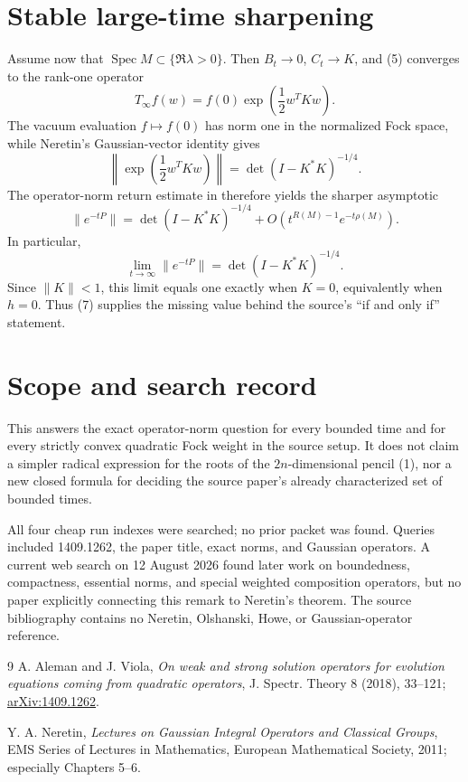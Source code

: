 \documentclass[11pt]{article}
\newcommand{\Spec}{\operatorname{Spec}}
\begin{document}
\section*{Stable large-time sharpening}

Assume now that \(\Spec M\subset\{\Re\lambda>0\}\).  Then \(B_t\to0\),
\(C_t\to K\), and (5) converges to the rank-one operator
\[
 T_\infty f(w)=f(0)\exp\!\left(\frac12w^TKw\right).
\]
The vacuum evaluation \(f\mapsto f(0)\) has norm one in the normalized Fock
space, while Neretin's Gaussian-vector identity gives
\[
 \left\|\exp\!\left(\frac12w^TKw\right)\right\|
 =\det(I-K^*K)^{-1/4}.
\]
The operator-norm return estimate in \cite[Proposition 4.4 and Remark 4.6]{AV}
therefore yields the sharper asymptotic
\[
 \boxed{
 \|e^{-tP}\|=\det(I-K^*K)^{-1/4}
 +O\!\left(t^{R(M)-1}e^{-t\rho(M)}\right).}             \tag{7}
\]
In particular,
\[
 \lim_{t\to\infty}\|e^{-tP}\|=\det(I-K^*K)^{-1/4}.
\]
Since \(\|K\|<1\), this limit equals one exactly when \(K=0\), equivalently
when \(h=0\).  Thus (7) supplies the missing value behind the source's
``if and only if'' statement.

\section*{Scope and search record}

This answers the exact operator-norm question for every bounded time and for
every strictly convex quadratic Fock weight in the source setup.  It does not
claim a simpler radical expression for the roots of the \(2n\)-dimensional
pencil (1), nor a new closed formula for deciding the source paper's already
characterized set of bounded times.

All four cheap run indexes were searched; no prior packet was found.  Queries
included 1409.1262, the paper title, exact norms, and Gaussian operators.  A
current web search on 12 August 2026
found later work on boundedness, compactness, essential norms, and special
weighted composition operators, but no paper explicitly connecting this
remark to Neretin's theorem.  The source bibliography contains no Neretin,
Olshanski, Howe, or Gaussian-operator reference.

\begin{thebibliography}{9}
A. Aleman and J. Viola,
\emph{On weak and strong solution operators for evolution equations coming
from quadratic operators},
J. Spectr. Theory 8 (2018), 33--121;
\href{https://arxiv.org/abs/1409.1262}{arXiv:1409.1262}.

Y. A. Neretin,
\emph{Lectures on Gaussian Integral Operators and Classical Groups},
EMS Series of Lectures in Mathematics, European Mathematical Society, 2011;
especially Chapters 5--6.
\end{thebibliography}
\end{document}
